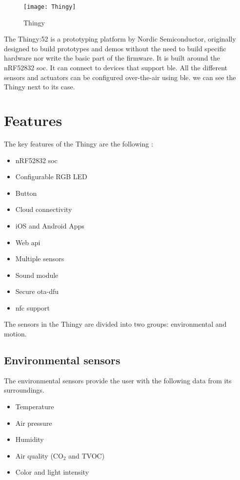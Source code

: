\begin{figure}[hbt!]
	\centering
	\texttt{[image: Thingy]}
	\caption{Thingy}
	\label{fig:thingy}
\end{figure}
The Thingy:52 is a prototyping platform by Nordic Semiconductor, originally designed to build prototypes and demos without the need to build specific hardware nor write the basic part of the firmware. It is built around the nRF52832 \gls{soc}. It can connect to devices that support \gls{ble}. All the different sensors and actuators can be configured over-the-air using \gls{ble}.  we can see the Thingy next to its case.

\section{Features} \label{sc:features}
The key features of the Thingy are the following \cite{DocFeatures}:
\begin{itemize}
	\item nRF52832 \gls{soc}
	\item Configurable RGB LED
	\item Button
	\item Cloud connectivity
	\item iOS and Android Apps
	\item Web \bt \gls{api}
	\item Multiple sensors
	\item Sound module
	\item Secure \gls{ota-dfu}
	\item \gls{nfc} support
\end{itemize}
The sensors in the Thingy are divided into two groups: environmental and motion.

\subsection{Environmental sensors}\label{sc:features_env}
The environmental sensors provide the user with the following data from its surroundings.
\begin{itemize}
	\item Temperature
	\item Air pressure
	\item Humidity
	\item Air quality (CO$_2$ and TVOC)
	\item Color and light intensity
\end{itemize}
